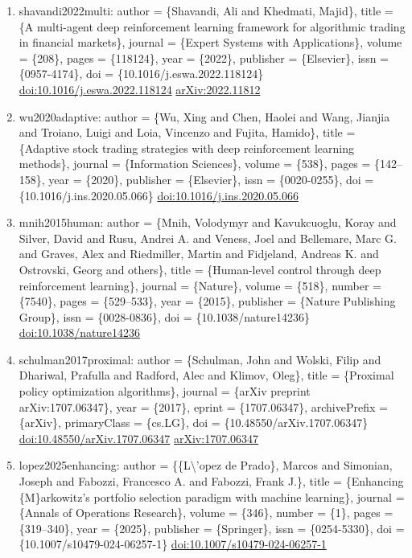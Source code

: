 \documentclass[11pt]{article}
\begin{document}
\begin{enumerate}[leftmargin=*]
  \item shavandi2022multi: author = \{Shavandi, Ali and Khedmati, Majid\}, title = \{A multi-agent deep reinforcement learning framework for algorithmic trading in financial markets\}, journal = \{Expert Systems with Applications\}, volume = \{208\}, pages = \{118124\}, year = \{2022\}, publisher = \{Elsevier\}, issn = \{0957-4174\}, doi = \{10.1016/j.eswa.2022.118124\} \href{https://doi.org/10.1016/j.eswa.2022.118124}{doi:10.1016/j.eswa.2022.118124} \href{https://arxiv.org/abs/2022.11812}{arXiv:2022.11812}
  \item wu2020adaptive: author = \{Wu, Xing and Chen, Haolei and Wang, Jianjia and Troiano, Luigi and Loia, Vincenzo and Fujita, Hamido\}, title = \{Adaptive stock trading strategies with deep reinforcement learning methods\}, journal = \{Information Sciences\}, volume = \{538\}, pages = \{142--158\}, year = \{2020\}, publisher = \{Elsevier\}, issn = \{0020-0255\}, doi = \{10.1016/j.ins.2020.05.066\} \href{https://doi.org/10.1016/j.ins.2020.05.066}{doi:10.1016/j.ins.2020.05.066}
  \item mnih2015human: author = \{Mnih, Volodymyr and Kavukcuoglu, Koray and Silver, David and Rusu, Andrei A. and Veness, Joel and Bellemare, Marc G. and Graves, Alex and Riedmiller, Martin and Fidjeland, Andreas K. and Ostrovski, Georg and others\}, title = \{Human-level control through deep reinforcement learning\}, journal = \{Nature\}, volume = \{518\}, number = \{7540\}, pages = \{529--533\}, year = \{2015\}, publisher = \{Nature Publishing Group\}, issn = \{0028-0836\}, doi = \{10.1038/nature14236\} \href{https://doi.org/10.1038/nature14236}{doi:10.1038/nature14236}
  \item schulman2017proximal: author = \{Schulman, John and Wolski, Filip and Dhariwal, Prafulla and Radford, Alec and Klimov, Oleg\}, title = \{Proximal policy optimization algorithms\}, journal = \{arXiv preprint arXiv:1707.06347\}, year = \{2017\}, eprint = \{1707.06347\}, archivePrefix = \{arXiv\}, primaryClass = \{cs.LG\}, doi = \{10.48550/arXiv.1707.06347\} \href{https://doi.org/10.48550/arXiv.1707.06347}{doi:10.48550/arXiv.1707.06347} \href{https://arxiv.org/abs/1707.06347}{arXiv:1707.06347}
  \item lopez2025enhancing: author = \{\{L\textbackslash{}'opez de Prado\}, Marcos and Simonian, Joseph and Fabozzi, Francesco A. and Fabozzi, Frank J.\}, title = \{Enhancing \{M\}arkowitz's portfolio selection paradigm with machine learning\}, journal = \{Annals of Operations Research\}, volume = \{346\}, number = \{1\}, pages = \{319--340\}, year = \{2025\}, publisher = \{Springer\}, issn = \{0254-5330\}, doi = \{10.1007/s10479-024-06257-1\} \href{https://doi.org/10.1007/s10479-024-06257-1}{doi:10.1007/s10479-024-06257-1}

\end{enumerate}
\end{document}
